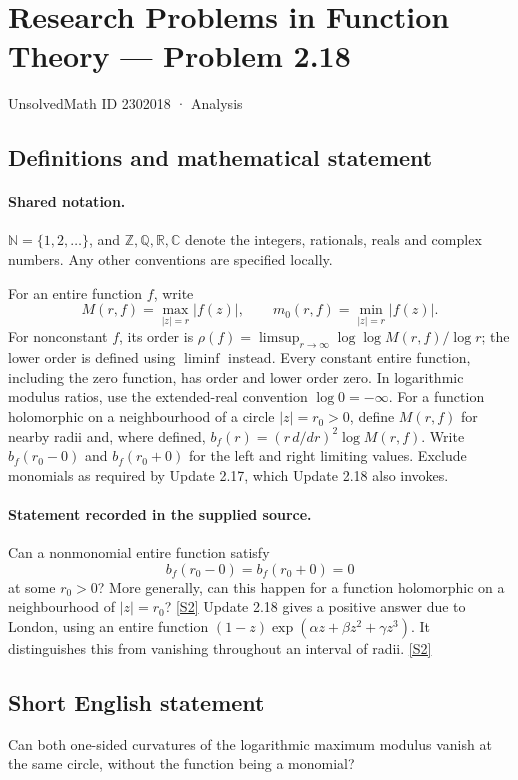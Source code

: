 \documentclass[11pt]{article}
\newcommand{\sref}[2]{\hyperlink{source:#1:#2}{[S#2]}}
\begin{document}
\setcounter{section}{2302017}
\section{Research Problems in Function Theory — Problem 2.18}\label{2302018}
{\small\sffamily UnsolvedMath ID 2302018 · Analysis}
\subsection{Definitions and mathematical statement}

\paragraph{Shared notation.}$\mathbb N=\{1,2,\ldots\}$, and $\mathbb Z,\mathbb Q,\mathbb R,\mathbb C$ denote the integers, rationals, reals and complex numbers. Any other conventions are specified locally.


For an entire function $f$, write
\[
 M(r,f)=\max_{|z|=r}|f(z)|,\qquad m_0(r,f)=\min_{|z|=r}|f(z)|.
\]
For nonconstant $f$, its order is $\rho(f)=\limsup_{r\to\infty}\log\log M(r,f)/\log r$;
the lower order is defined using $\liminf$ instead. Every constant entire function, including the zero function, has order and lower order zero. In logarithmic modulus ratios, use the extended-real convention $\log0=-\infty$.
For a function holomorphic on a neighbourhood of a circle $|z|=r_0>0$, define $M(r,f)$ for nearby radii and, where defined,
$b_f(r)=(r\,d/dr)^2\log M(r,f)$. Write $b_f(r_0-0)$ and $b_f(r_0+0)$ for the left and right limiting values.
Exclude monomials as required by Update 2.17, which Update 2.18 also invokes.

\paragraph{Statement recorded in the supplied source.}
Can a nonmonomial entire function satisfy
\[b_f(r_0-0)=b_f(r_0+0)=0\]
at some $r_0>0$? More generally, can this happen for a function holomorphic on a neighbourhood of $|z|=r_0$? \sref{2302018}{2}
Update 2.18 gives a positive answer due to London, using an entire function $(1-z)\exp(\alpha z+\beta z^2+\gamma z^3)$. It distinguishes this from vanishing throughout an interval of radii. \sref{2302018}{2}
\subsection{Short English statement}
Can both one-sided curvatures of the logarithmic maximum modulus vanish at the same circle, without the function being a monomial?
\end{document}
